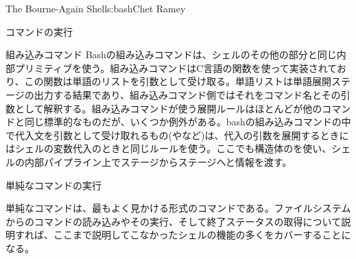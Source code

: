 \begin{aosachapter}{The Bourne-Again Shell}{s:bash}{Chet Ramey}
\begin{aosasect1}{コマンドの実行}
\begin{aosasect2}{組み込みコマンド}
Bashの組み込みコマンドは、シェルのその他の部分と同じ内部プリミティブを使う。組み込みコマンドはC言語の関数を使って実装されており、この関数は単語のリストを引数として受け取る。単語リストは単語展開ステージの出力する結果であり、組み込みコマンド側ではそれをコマンド名とその引数として解釈する。組み込みコマンドが使う展開ルールはほとんどが他のコマンドと同じ標準的なものだが、いくつか例外がある。bashの組み込みコマンドの中で代入文を引数として受け取れるもの(やなど)は、代入の引数を展開するときにはシェルの変数代入のときと同じルールを使う。ここでも構造体のを使い、シェルの内部パイプライン上でステージからステージへと情報を渡す。

\end{aosasect2}

\begin{aosasect2}{単純なコマンドの実行}

単純なコマンドは、最もよく見かける形式のコマンドである。ファイルシステムからのコマンドの読み込みやその実行、そして終了ステータスの取得について説明すれば、ここまで説明してこなかったシェルの機能の多くをカバーすることになる。


\end{aosasect2}
\end{aosasect1}
\end{aosachapter}
